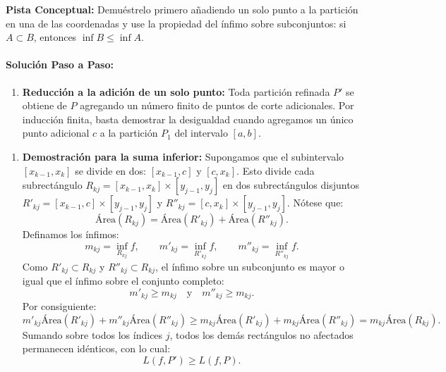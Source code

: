 \documentclass[11pt,a4paper]{article}
\begin{document}
\begin{tcolorbox}[colback=yellow!4,colframe=accentamber!70,arc=1mm,boxrule=0.5pt,left=3mm,right=3mm,top=1.5mm,bottom=1.5mm]
\textbf{Pista Conceptual:} Demuéstrelo primero añadiendo un solo punto a la partición en una de las coordenadas y use la propiedad del ínfimo sobre subconjuntos: si $A \subset B$, entonces $\inf B \le \inf A$.
\end{tcolorbox}

\paragraph{Solución Paso a Paso:}\par
\begin{enumerate}[label=\textbf{\arabic*.}]
\item \textbf{Reducción a la adición de un solo punto:}
Toda partición refinada $P'$ se obtiene de $P$ agregando un número finito de puntos de corte adicionales. Por inducción finita, basta demostrar la desigualdad cuando agregamos un único punto adicional $c$ a la partición $P_1$ del intervalo $[a,b]$.
\end{enumerate}

\begin{enumerate}[label=\textbf{\arabic*.}]
\item \textbf{Demostración para la suma inferior:}
Supongamos que el subintervalo $[x_{k-1}, x_k]$ se divide en dos: $[x_{k-1}, c]$ y $[c, x_k]$.
Esto divide cada subrectángulo $R_{kj} = [x_{k-1}, x_k] \times [y_{j-1}, y_j]$ en dos subrectángulos disjuntos $R'_{kj} = [x_{k-1}, c] \times [y_{j-1}, y_j]$ y $R''_{kj} = [c, x_k] \times [y_{j-1}, y_j]$.
Nótese que:
\begin{equation*}
\text{Área}(R_{kj}) = \text{Área}(R'_{kj}) + \text{Área}(R''_{kj}).
\end{equation*}
Definamos los ínfimos:
\begin{equation*}
m_{kj} = \inf_{R_{kj}} f, \qquad m'_{kj} = \inf_{R'_{kj}} f, \qquad m''_{kj} = \inf_{R''_{kj}} f.
\end{equation*}
Como $R'_{kj} \subset R_{kj}$ y $R''_{kj} \subset R_{kj}$, el ínfimo sobre un subconjunto es mayor o igual que el ínfimo sobre el conjunto completo:
\begin{equation*}
m'_{kj} \ge m_{kj} \quad \text{y} \quad m''_{kj} \ge m_{kj}.
\end{equation*}
Por consiguiente:
\begin{equation*}
m'_{kj} \text{Área}(R'_{kj}) + m''_{kj} \text{Área}(R''_{kj}) \ge m_{kj} \text{Área}(R'_{kj}) + m_{kj} \text{Área}(R''_{kj}) = m_{kj} \text{Área}(R_{kj}).
\end{equation*}
Sumando sobre todos los índices $j$, todos los demás rectángulos no afectados permanecen idénticos, con lo cual:
\begin{equation*}
L(f, P') \ge L(f, P).
\end{equation*}
\end{enumerate}
\end{document}
